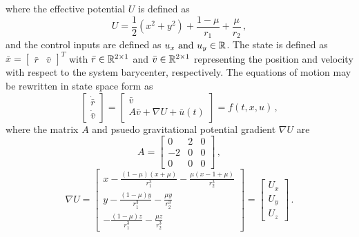 \documentclass[preprint]{elsarticle}
\begin{document}
where the effective potential \( U\) is defined as
\begin{equation}
	U = \frac{1}{2} \left( x^2 + y^2\right) + \frac{1-\mu}{r_1} + \frac{\mu}{r_2}\, ,
	\label{eq:eff_pot}
\end{equation}
and the control inputs are defined as \( u_x \text{ and } u_y \in \mathbb{R} \).
The state is defined as \( \bar{x} = \begin{bmatrix}\bar{r} &\bar{v} \end{bmatrix}^T\) with \(\bar{r} \in \mathbb{R}^{2\times1}\) and \(\bar{v} \in \mathbb{R}^{2\times1}\) representing the position and velocity with respect to the system barycenter, respectively.
The equations of motion may be rewritten in state space form as
\begin{equation}\label{eqn:cont_dyn}
	\left[\begin{array}{c} \dot{\bar{r}} \\ \dot{\bar{v}} \end{array} \right] = 
	\left[ \begin{array}{c} \bar{v} \\ A \bar{v} + \nabla U + \bar{u}(t) \end{array} \right] = f\left( t,x, u\right) \, ,
\end{equation}
where the matrix \( A \) and psuedo gravitational potential gradient \( \nabla U\) are
\begin{equation}\label{eq:A_mat}
	A = \left[ \begin{array}{ccc} 0 & 2 & 0 \\ -2 & 0 & 0 \\ 0 & 0 & 0 \end{array} \right] \, ,
\end{equation}
\begin{equation} \label{eq:grav_pot}
	\nabla U = \left[ \begin{array}{c} x - \frac{ \left(1 - \mu\right) \left(x + \mu\right)}{r_1^3} - \frac{\mu \left( x - 1 + \mu \right)}{r_2^3} \\
											y - \frac{ \left(1 - \mu\right) y}{r_1^3} - \frac{\mu y}{r_2^3} \\
											- \frac{ \left(1 - \mu\right) z}{r_1^3} - \frac{\mu z}{r_2^3}\end{array}\right]
					= \left[\begin{array}{c} U_x \\ U_y \\ U_z\end{array} \right] \, .
\end{equation}
\end{document}
